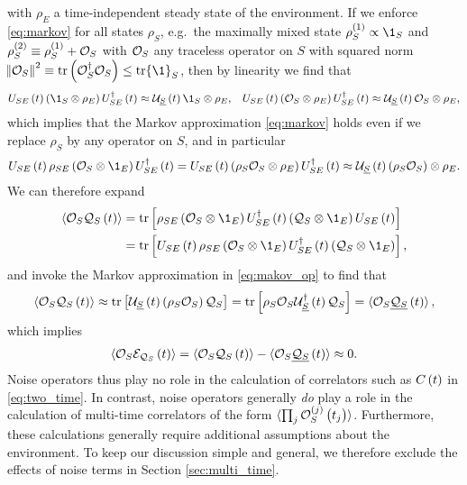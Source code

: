 with $\rho_E$ a time-independent steady state of the environment.  If
we enforce \eqref{eq:markov} for all states $\rho_S$, e.g.~the
maximally mixed state $\rho_S^{(1)}\propto\1_S$ and
$\rho_S^{(2)}\equiv\rho_S^{(1)}+\mathcal{O}_S$ with $\mathcal{O}_S$ any traceless
operator on $S$ with squared norm
$\norm{\O_S}^2\equiv\tr\p{\O_S^\dag\O_S}\le\tr\1_S$, then by linearity
we find that
\begin{align}
  U_{SE}\p{t} \p{\1_S\otimes\rho_E} U_{SE}^\dag\p{t}
  \approx \U_{\ul S}\p{t} \1_S\otimes\rho_E,
  &&
  U_{SE}\p{t} \p{\O_S\otimes\rho_E} U_{SE}^\dag\p{t}
  \approx \U_{\ul S}\p{t} \O_S\otimes\rho_E,
\end{align}
which implies that the Markov approximation \eqref{eq:markov} holds
even if we replace $\rho_S$ by any operator on $S$, and in particular
\begin{align}
  U_{SE}\p{t} \rho_{SE} \p{\O_S\otimes\1_E} U_{SE}^\dag\p{t}
  = U_{SE}\p{t} \p{\rho_S\O_S\otimes\rho_E} U_{SE}^\dag\p{t}
  \approx \U_{\ul S}\p{t}\p{\rho_S\O_S}\otimes\rho_E.
  \label{eq:makov_op}
\end{align}
We can therefore expand
\begin{align}
  \bk{\O_S\Q_S\p{t}}
  &= \tr\sp{\rho_{SE} \p{\O_S\otimes\1_E}
    U_{SE}^\dag\p{t} \p{\Q_S\otimes\1_E} U_{SE}\p{t}} \\
  &= \tr\sp{U_{SE}\p{t} \rho_{SE} \p{\O_S\otimes\1_E}
    U_{SE}^\dag\p{t} \p{\Q_S\otimes\1_E}},
\end{align}
and invoke the Markov approximation in \eqref{eq:makov_op} to find
that
\begin{align}
  \braket{\mathcal{O}_S\mathcal{Q}_S\left( t \right)}
  \approx \tr\left[ \mathcal{U}_{\underline S}\left( t \right)\left( \rho_S\mathcal{O}_S \right) \mathcal{Q}_S \right]
  = \tr\left[ \rho_S \mathcal{O}_S \mathcal{U}_{\underline S}^\dag\left( t \right) \mathcal{Q}_S \right]
  = \braket{\mathcal{O}_S\underline{\mathcal{Q}_S}\left( t \right)},
\end{align}
which implies
\begin{align}
  \braket{\mathcal{O}_S\mathcal{E}_{\mathcal{Q}_S}\left( t \right)}
  = \braket{\mathcal{O}_S\mathcal{Q}_S\left( t \right)} - \braket{\mathcal{O}_S\underline{\mathcal{Q}_S}\left( t \right)}
  \approx 0.
\end{align}
Noise operators thus play no role in the calculation of correlators
such as $C\left( t \right)$ in \eqref{eq:two_time}.  In contrast, noise operators
generally {\it do} play a role in the calculation of multi-time
correlators of the form
$\braket{\prod_j\mathcal{O}_S^{(j)}\left( t_j \right)}$\cite{blocher2019quantum}.
Furthermore, these calculations generally require additional
assumptions about the environment.  To keep our discussion simple and
general, we therefore exclude the effects of noise terms in Section
\ref{sec:multi_time}.
